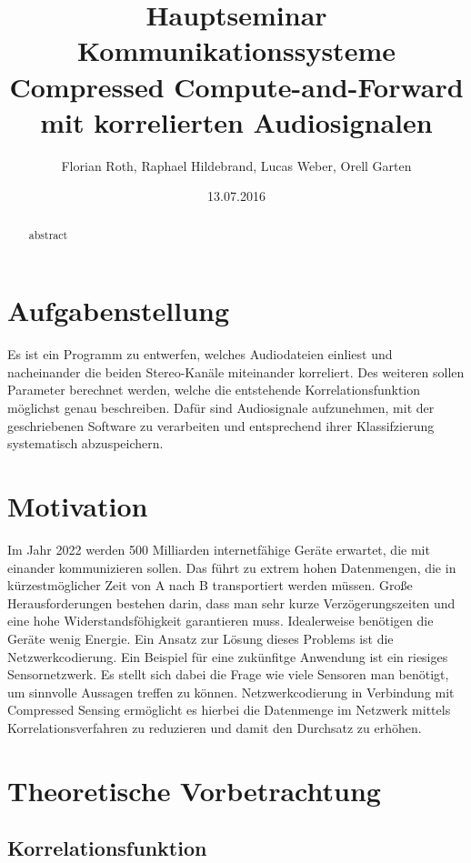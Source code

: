 \documentclass[a4paper,11pt]{article}
\title{Hauptseminar Kommunikationssysteme \\ Compressed Compute-and-Forward mit korrelierten Audiosignalen}
\date{13.07.2016}
\author{Florian Roth, Raphael Hildebrand, Lucas Weber, Orell Garten}
\begin{document}

\maketitle
\begin{abstract}
abstract
\end{abstract}
\newpage

\tableofcontents
\newpage
{}


\section{Aufgabenstellung}
Es ist ein Programm zu entwerfen, welches Audiodateien einliest und nacheinander die beiden Stereo-Kanäle miteinander korreliert. Des weiteren sollen Parameter berechnet werden, welche die entstehende Korrelationsfunktion möglichst genau beschreiben. Dafür sind Audiosignale aufzunehmen, mit der geschriebenen Software zu verarbeiten und entsprechend ihrer Klassifzierung systematisch abzuspeichern.
\section{Motivation}
Im Jahr 2022 werden 500 Milliarden internetfähige Geräte erwartet, die mit einander kommunizieren sollen. Das führt zu extrem hohen Datenmengen, die in kürzestmöglicher Zeit von A nach B transportiert werden müssen. Große Herausforderungen bestehen darin, dass man sehr kurze Verzögerungszeiten und eine hohe Widerstandsföhigkeit garantieren muss. Idealerweise benötigen die Geräte wenig Energie. Ein Ansatz zur Lösung dieses Problems ist die Netzwerkcodierung.\newline
Ein Beispiel für eine zukünfitge Anwendung ist ein riesiges Sensornetzwerk. Es stellt sich dabei die Frage wie viele Sensoren man benötigt, um sinnvolle Aussagen treffen zu können. Netzwerkcodierung in Verbindung mit Compressed Sensing ermöglicht es hierbei die Datenmenge im Netzwerk mittels Korrelationsverfahren zu reduzieren und damit den Durchsatz zu erhöhen. 

\section{Theoretische Vorbetrachtung}
\subsection{Korrelationsfunktion}
\end{document}
